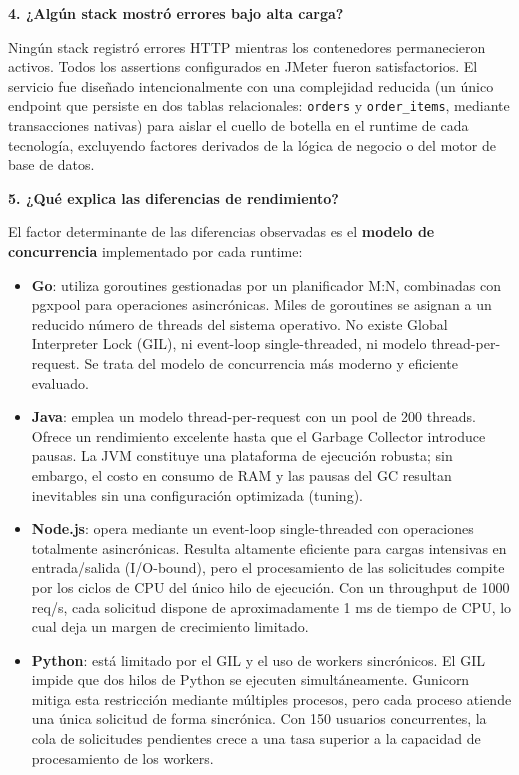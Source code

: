 \documentclass[12pt,a4paper]{article}
\begin{document}
\textbf{4. ¿Algún stack mostró errores bajo alta carga?}

Ningún stack registró errores HTTP mientras los contenedores permanecieron activos. Todos los assertions configurados en JMeter fueron satisfactorios. El servicio fue diseñado intencionalmente con una complejidad reducida (un único endpoint que persiste en dos tablas relacionales: \texttt{orders} y \texttt{order\_items}, mediante transacciones nativas) para aislar el cuello de botella en el runtime de cada tecnología, excluyendo factores derivados de la lógica de negocio o del motor de base de datos.

\textbf{5. ¿Qué explica las diferencias de rendimiento?}

El factor determinante de las diferencias observadas es el \textbf{modelo de concurrencia} implementado por cada runtime:

\begin{itemize}
    \item \textbf{Go}: utiliza goroutines gestionadas por un planificador M:N, combinadas con pgxpool para operaciones asincrónicas. Miles de goroutines se asignan a un reducido número de threads del sistema operativo. No existe Global Interpreter Lock (GIL), ni event-loop single-threaded, ni modelo thread-per-request. Se trata del modelo de concurrencia más moderno y eficiente evaluado.
    \item \textbf{Java}: emplea un modelo thread-per-request con un pool de 200 threads. Ofrece un rendimiento excelente hasta que el Garbage Collector introduce pausas. La JVM constituye una plataforma de ejecución robusta; sin embargo, el costo en consumo de RAM y las pausas del GC resultan inevitables sin una configuración optimizada (tuning).
    \item \textbf{Node.js}: opera mediante un event-loop single-threaded con operaciones totalmente asincrónicas. Resulta altamente eficiente para cargas intensivas en entrada/salida (I/O-bound), pero el procesamiento de las solicitudes compite por los ciclos de CPU del único hilo de ejecución. Con un throughput de 1000 req/s, cada solicitud dispone de aproximadamente 1 ms de tiempo de CPU, lo cual deja un margen de crecimiento limitado.
    \item \textbf{Python}: está limitado por el GIL y el uso de workers sincrónicos. El GIL impide que dos hilos de Python se ejecuten simultáneamente. Gunicorn mitiga esta restricción mediante múltiples procesos, pero cada proceso atiende una única solicitud de forma sincrónica. Con 150 usuarios concurrentes, la cola de solicitudes pendientes crece a una tasa superior a la capacidad de procesamiento de los workers.
\end{itemize}
\end{document}
